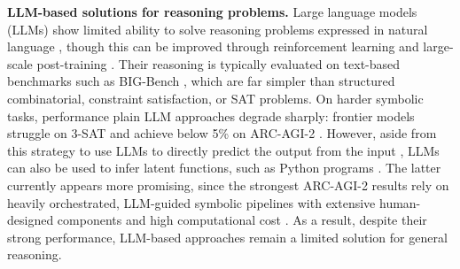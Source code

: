\documentclass{article}
\theoremstyle{plain}
\theoremstyle{definition}
\theoremstyle{remark}
\renewcommand{\paragraph}[1]{\textbf{#1}\;}
\begin{document}
\paragraph{LLM-based solutions for reasoning problems.}
Large language models (LLMs) \citep{peters2018deep,devlin2019bert,brown2020language} 
show limited ability to solve reasoning problems expressed in natural language 
\citep{wei2022chain,wei2022emergent,srivastava2023beyond}, 
though this can be improved through 
reinforcement learning and large-scale post-training \citep{guo2025deepseek}. 
Their reasoning is typically evaluated on text-based benchmarks such as BIG-Bench 
\citep{srivastava2023beyond}, which are far simpler than structured combinatorial, 
constraint satisfaction, or SAT problems. 
On harder symbolic tasks, performance plain 
LLM approaches 
degrade sharply: frontier models struggle  
on 3-SAT \citep{hazra2024can} and 
achieve below 5\% on ARC-AGI-2 \citep{chollet2025arc}. 
However, aside from this strategy to use LLMs to directly
predict the output from the input \citep{cole2025don}, LLMs can also be 
used to infer
latent functions, such as Python programs \citep{li2024combining,ellis2020dreamcoder, pourcel2025self,mirchandani2023large}. The latter currently 
appears more promising, since
the strongest ARC-AGI-2 results rely on heavily orchestrated, LLM-guided symbolic pipelines 
with extensive human-designed components and high computational cost 
\citep{poetiq2025arcagi2}. 
As a result, despite their strong performance, 
LLM-based approaches remain 
a limited solution for general reasoning.
\end{document}
